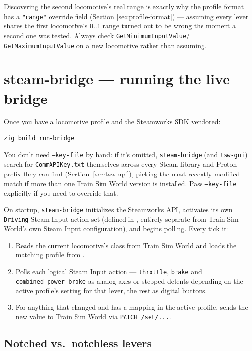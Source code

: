 \documentclass[11pt,a4paper]{article}
\newcommand{\code}[1]{\texttt{#1}}
\begin{document}
Discovering the second locomotive's real range is exactly why the profile
format has a \code{"range"} override field (Section
\ref{sec:profile-format}) --- assuming every lever shares the first
locomotive's 0..1 range turned out to be wrong the moment a second one
was tested. Always check \code{GetMinimumInputValue}/
\code{GetMaximumInputValue} on a new locomotive rather than assuming.

\section{steam-bridge --- running the live bridge}
\label{sec:steam-bridge}

Once you have a locomotive profile and the Steamworks SDK vendored:

\begin{lstlisting}
zig build run-bridge
\end{lstlisting}

You don't need \code{--key-file} by hand: if it's omitted,
\code{steam-bridge} (and \code{tsw-gui}) search for \code{CommAPIKey.txt}
themselves across every Steam library and Proton prefix they can find
(Section~\ref{sec:tsw-api}), picking the most recently modified match if
more than one Train Sim World version is installed. Pass \code{--key-file}
explicitly if you need to override that.

On startup, \code{steam-bridge} initializes the Steamworks API, activates
its own \code{Driving} Steam Input action set (defined in
, entirely separate from Train Sim
World's own Steam Input configuration), and begins polling. Every tick it:

\begin{enumerate}[leftmargin=1.5em]
    \item Reads the current locomotive's class from Train Sim World and
    loads the matching profile from .
    \item Polls each logical Steam Input action --- \code{throttle},
    \code{brake} and \code{combined\_power\_brake} as analog axes or
    stepped detents depending on the active profile's setting for that
    lever, the rest as digital buttons.
    \item For anything that changed and has a mapping in the active
    profile, sends the new value to Train Sim World via \code{PATCH
    /set/...}.
\end{enumerate}

\subsection*{Notched vs.\ notchless levers}
\end{document}
